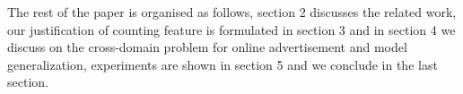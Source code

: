 The rest of the paper is organised as follows, section 2 discusses the related work, our justification of counting feature is formulated in section 3 and in section 4 we discuss on the cross-domain problem for online advertisement and model generalization, experiments are shown in section 5 and we conclude in the last section.




